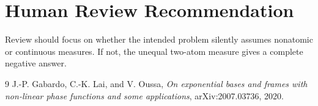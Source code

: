 \documentclass[11pt]{article}
\begin{document}
\section{Human Review Recommendation}

Review should focus on whether the intended problem silently assumes nonatomic
or continuous measures. If not, the unequal two-atom measure gives a complete
negative answer.

\begin{thebibliography}{9}
J.-P. Gabardo, C.-K. Lai, and V. Oussa,
\emph{On exponential bases and frames with non-linear phase functions and some
applications}, arXiv:2007.03736, 2020.
\end{thebibliography}
\end{document}
